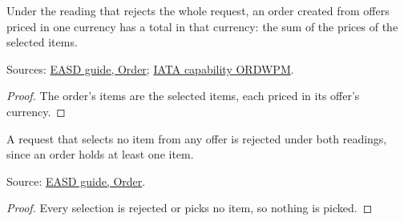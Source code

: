 \begin{theorem}
  \label{thm:order-creation-price-sum-of-whole}
  Under the reading that rejects the whole request, an order created from
  offers priced in one currency has a total in that currency: the sum of the
  prices of the selected items.

  Sources: \href{https://standards.atlassian.net/wiki/spaces/EASD/pages/574849062/Order}{EASD guide, Order};
  \href{https://retailing.iata.org/armi/docs/ORDWPM/}{IATA capability ORDWPM}.
\end{theorem}
\begin{proof}
  The order's items are the selected items, each priced in its offer's
  currency.
\end{proof}

\begin{theorem}
  \label{thm:order-creation-no-items}
  A request that selects no item from any offer is rejected under both
  readings, since an order holds at least one item.

  Source: \href{https://standards.atlassian.net/wiki/spaces/EASD/pages/574849062/Order}{EASD guide, Order}.
\end{theorem}
\begin{proof}
  Every selection is rejected or picks no item, so nothing is picked.
\end{proof}

